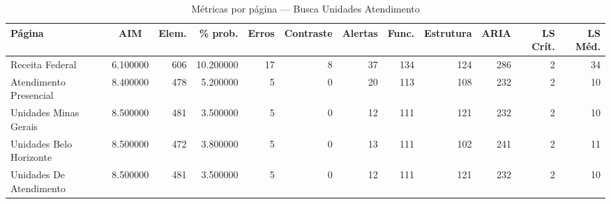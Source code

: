 \begin{table}[htbp]
  \centering
  \caption{Métricas por página — Busca Unidades Atendimento}
  \label{tab:flow_busca_unidades_atendimento}
  \small
  \begin{tabular}{lcrrrrrrrrrr}
\toprule
Página & AIM & Elem. & \% prob. & Erros & Contraste & Alertas & Func. & Estrutura & ARIA & LS Crít. & LS Méd. \\
\midrule
Receita Federal & 6.100000 & 606 & 10.200000 & 17 & 8 & 37 & 134 & 124 & 286 & 2 & 34 \\
Atendimento Presencial & 8.400000 & 478 & 5.200000 & 5 & 0 & 20 & 113 & 108 & 232 & 2 & 10 \\
Unidades Minas Gerais & 8.500000 & 481 & 3.500000 & 5 & 0 & 12 & 111 & 121 & 232 & 2 & 10 \\
Unidades Belo Horizonte & 8.500000 & 472 & 3.800000 & 5 & 0 & 13 & 111 & 102 & 241 & 2 & 11 \\
Unidades De Atendimento & 8.500000 & 481 & 3.500000 & 5 & 0 & 12 & 111 & 121 & 232 & 2 & 10 \\
\bottomrule
\end{tabular}
\end{table}
